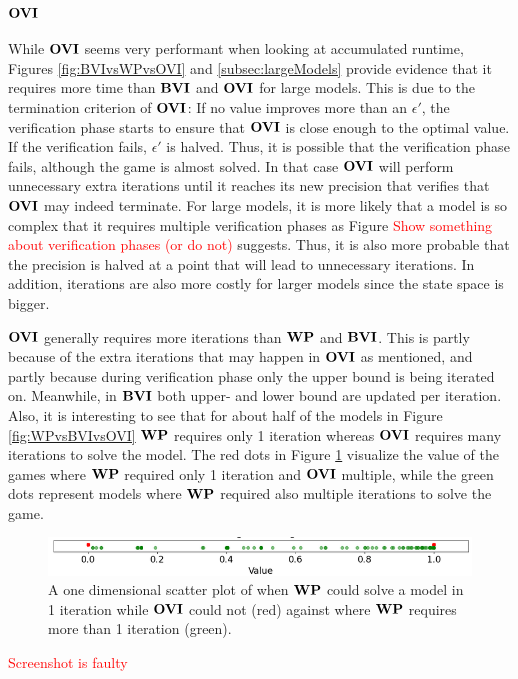 \subsubsection*{$\OVI$}
While $\OVI$ seems very performant when looking at accumulated runtime, Figures \ref{fig:BVIvsWPvsOVI} and \ref{subsec:largeModels} provide evidence that it requires more time than $\mathbf{BVI}$ and $\OVI$ for large models.
This is due to the termination criterion of $\OVI$: 
If no value improves more than an $\epsilon'$, the verification phase starts to ensure that $\OVI$ is close enough to the optimal value.
If the verification fails, $\epsilon'$ is halved. 
Thus, it is possible that the verification phase fails, although the game is almost solved.
In that case $\OVI$ will perform unnecessary extra iterations until it reaches its new precision that verifies that $\OVI$ may indeed terminate.
For large models, it is more likely that a model is so complex that it requires multiple verification phases as Figure
\textcolor{red}{Show something about verification phases (or do not)} suggests. 
Thus, it is also more probable that the precision is halved at a point that will lead to unnecessary iterations.
In addition, iterations are also more costly for larger models since the state space is bigger.

$\OVI$ generally requires more iterations than $\mathbf{WP}$ and $\mathbf{BVI}$. This is partly because of the extra iterations that may happen in $\OVI$ as mentioned, 
and partly because during verification phase only the upper bound is being iterated on. Meanwhile, in $\mathbf{BVI}$ both upper- and lower bound are updated per iteration.
Also, it is interesting to see that for about half of the models in Figure \ref{fig:WPvsBVIvsOVI} $\mathbf{WP}$ requires only 1 iteration whereas $\OVI$ requires many iterations to solve the model.
The red dots in Figure \ref{fig:OVIinstantCompute} visualize the value of the games where $\mathbf{WP}$ required only 1 iteration and $\OVI$ multiple,
while the green dots represent models where $\mathbf{WP}$ required also multiple iterations to solve the game.

\begin{figure}[h!]
    \centering
    \includegraphics[width=1\textwidth]{figures/OVI_Bad_At_Computing_Instant_Values.png}
    \caption[$\OVI$ cannot instantly compute models]{
        A one dimensional scatter plot of when $\mathbf{WP}$ could solve a model in 1 iteration while $\OVI$ could not (red) 
        against where $\mathbf{WP}$ requires more than 1 iteration (green).
    }
    \label{fig:OVIinstantCompute}
\end{figure}
\textcolor{red}{Screenshot is faulty}
\FloatBarrier

